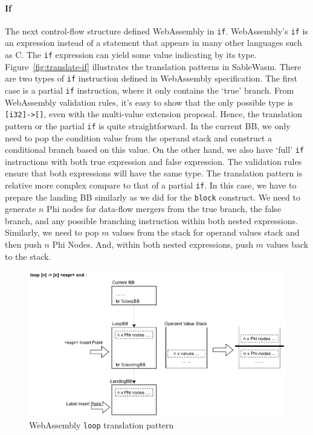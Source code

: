 \paragraph{If}
The next control-flow structure defined WebAssembly in \texttt{if}. WebAssembly's \texttt{if} is an expression instead of a statement that appears in many other languages such as C.  The \texttt{if} expression can yield some value indicating by its type. Figure~\ref{fig:translate-if} illustrates the translation patterns in SableWasm. There are two types of \texttt{if} instruction defined in WebAssembly specification. The first case is a partial \texttt{if} instruction, where it only contains the `true' branch. From WebAssembly validation rules, it's easy to show that the only possible type is \texttt{[i32]->[]}, even with the multi-value extension proposal. Hence, the translation pattern or the partial \texttt{if} is quite straightforward. In the current BB, we only need to pop the condition value from the operand stack and construct a conditional branch based on this value. On the other hand, we also have `full' \texttt{if} instructions with both true expression and false expression. The validation rules ensure that both expressions will have the same type. The translation pattern is relative more complex compare to that of a partial \texttt{if}. In this case, we have to prepare the landing BB similarly as we did for the \texttt{block} construct. We need to generate $n$ Phi nodes for data-flow mergers from the true branch, the false branch, and any possible branching instruction within both nested expressions. Similarly, we need to pop $m$ values from the stack for operand values stack and then push $n$ Phi Nodes. And, within both nested expressions, push $m$ values back to the stack.

\begin{figure}
  \centering
  \includegraphics[width=\textwidth]{Images/4.MIR/translate-loop.pdf}
  \caption{WebAssembly \texttt{loop} translation pattern}
  \label{fig:translate-loop}
\end{figure}

